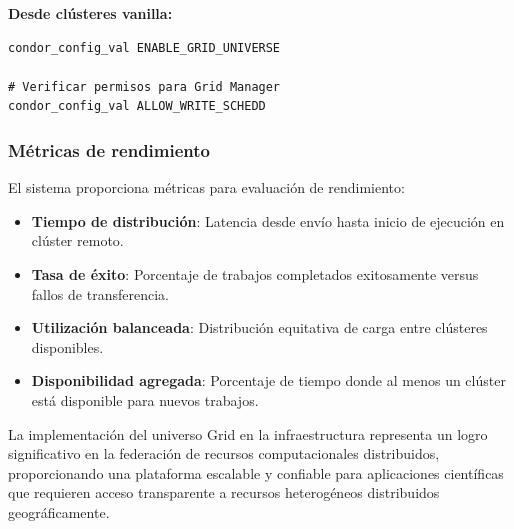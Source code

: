 \textbf{Desde clústeres vanilla:}

\begin{verbatim}
condor_config_val ENABLE_GRID_UNIVERSE

# Verificar permisos para Grid Manager
condor_config_val ALLOW_WRITE_SCHEDD
\end{verbatim}

\subsubsection{Métricas de rendimiento}
\noindent

El sistema proporciona métricas para evaluación de rendimiento:

\begin{itemize}
	\item \textbf{Tiempo de distribución}: Latencia desde envío hasta inicio de ejecución en clúster remoto.
	
	\item \textbf{Tasa de éxito}: Porcentaje de trabajos completados exitosamente versus fallos de transferencia.
	
	\item \textbf{Utilización balanceada}: Distribución equitativa de carga entre clústeres disponibles.
	
	\item \textbf{Disponibilidad agregada}: Porcentaje de tiempo donde al menos un clúster está disponible para nuevos trabajos.
\end{itemize}

La implementación del universo Grid en la infraestructura \GRID representa un logro significativo en la federación de recursos computacionales distribuidos, proporcionando una plataforma escalable y confiable para aplicaciones científicas que requieren acceso transparente a recursos heterogéneos distribuidos geográficamente.
